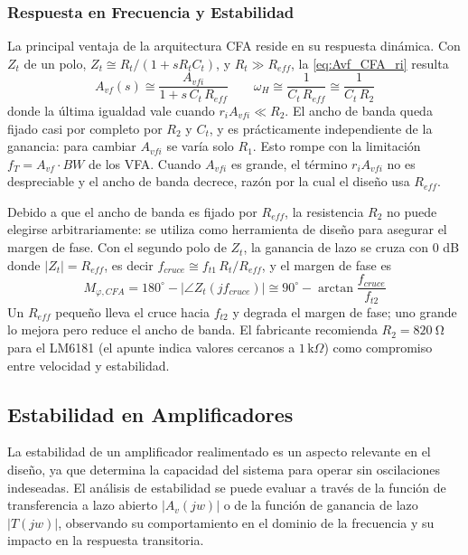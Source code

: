 \subsubsection{Respuesta en Frecuencia y Estabilidad}
La principal ventaja de la arquitectura CFA reside en su respuesta dinámica. Con $Z_t$ de un polo, $Z_t \cong R_t/(1+sR_tC_t)$, y $R_t \gg R_{eff}$, la \autoref{eq:Avf_CFA_ri} resulta
\begin{equation}
    A_{vf}(s) \cong \frac{A_{vfi}}{1 + s\,C_t\,R_{eff}} \qquad \omega_H \cong \frac{1}{C_t\,R_{eff}} \cong \frac{1}{C_t\,R_2}
    \label{eq:wH_CFA}
\end{equation}
donde la última igualdad vale cuando $r_iA_{vfi} \ll R_2$. El ancho de banda queda fijado casi por completo por $R_2$ y $C_t$, y es prácticamente independiente de la ganancia: para cambiar $A_{vfi}$ se varía solo $R_1$. Esto rompe con la limitación $f_T = A_{vf}\cdot BW$ de los VFA. Cuando $A_{vfi}$ es grande, el término $r_iA_{vfi}$ no es despreciable y el ancho de banda decrece, razón por la cual el diseño usa $R_{eff}$.

Debido a que el ancho de banda es fijado por $R_{eff}$, la resistencia $R_2$ no puede elegirse arbitrariamente: se utiliza como herramienta de diseño para asegurar el margen de fase. Con el segundo polo de $Z_t$, la ganancia de lazo se cruza con 0 dB donde $|Z_t| = R_{eff}$, es decir $f_{cruce} \cong f_{t1}\,R_t/R_{eff}$, y el margen de fase es
\begin{equation}
    M_{\varphi,CFA} = 180^\circ - \left|\angle Z_t(jf_{cruce})\right| \cong 90^\circ - \arctan\frac{f_{cruce}}{f_{t2}}
    \label{eq:Mphi_CFA}
\end{equation}
Un $R_{eff}$ pequeño lleva el cruce hacia $f_{t2}$ y degrada el margen de fase; uno grande lo mejora pero reduce el ancho de banda. El fabricante recomienda $R_2 = \SI{820}{\ohm}$ para el LM6181 (el apunte indica valores cercanos a $1\,\mathrm{k}\Omega$) como compromiso entre velocidad y estabilidad.

\subsection{Estabilidad en Amplificadores}

La estabilidad de un amplificador realimentado es un aspecto relevante en el diseño, ya que determina la capacidad del sistema para operar sin oscilaciones indeseadas. El análisis de estabilidad se puede evaluar a través de la función de transferencia a lazo abierto $|A_v(jw)|$ o de la función de ganancia de lazo $|T(jw)|$, observando su comportamiento en el dominio de la frecuencia y su impacto en la respuesta transitoria.

